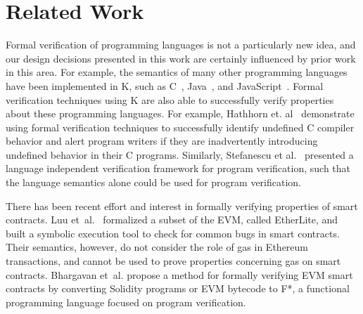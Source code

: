 \section{Related Work}
Formal verification of programming languages is not a particularly new idea,
and our design decisions presented in this work are certainly influenced by
prior work in this area. For example, the semantics of many other programming
languages have been implemented in K, such as
C~\cite{ellison-2012-thesis}, Java~\cite{bogdanas-rosu-2015-popl},
and JavaScript~\cite{park-stefanescu-rosu-2015-pldi}. Formal verification
techniques using K are also able to successfully verify properties about these
programming languages. For example, Hathhorn et.
al~\cite{hathhorn-ellison-rosu-2015-pldi} demonstrate using formal verification
techniques to successfully identify undefined C compiler behavior and alert
program writers if they are inadvertently introducing undefined behavior in
their C programs. Similarly, Stefanescu et al.~\cite{stefanescu-park-yuwen-li-rosu-2016-oopsla} presented a language independent verification framework for program verification, such that the language semantics alone could be used for program verification.

There has been recent effort and interest in formally verifying properties of
smart contracts. Luu et~al.~\cite{luumaking} formalized a subset of the EVM,
called EtherLite, and built a symbolic execution tool to check for common bugs
in smart contracts. Their semantics, however, do not consider the role of gas in
Ethereum transactions, and cannot be used to prove properties concerning gas on
smart contracts. Bhargavan et~al.\cite{evmf*} propose a method for formally
verifying EVM smart contracts by converting Solidity programs or EVM bytecode to
F*, a functional programming language focused on program verification.
